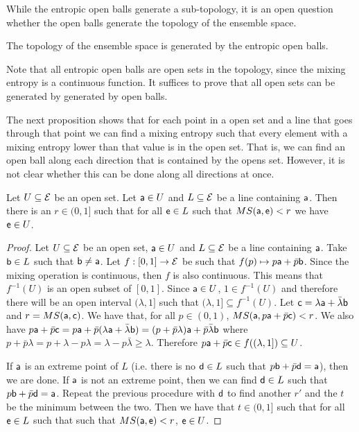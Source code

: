While the entropic open balls generate a sub-topology, it is an open question whether the open balls generate the topology of the ensemble space.

\begin{conj}
	The topology of the ensemble space is generated by the entropic open balls.
\end{conj}

\begin{remark}
	Note that all entropic open balls are open sets in the topology, since the mixing entropy is a continuous function. It suffices to prove that all open sets can be generated by generated by open balls.
	
	The next proposition shows that for each point in a open set and a line that goes through that point we can find a mixing entropy such that every element with a mixing entropy lower than that value is in the open set. That is, we can find an open ball along each direction that is contained by the opens set. However, it is not clear whether this can be done along all directions at once.
\end{remark}

\begin{prop}
	Let $U \subseteq \Ens$ be an open set. Let $\ens[a] \in U$ and $L \subseteq \Ens$ be a line containing $\ens[a]$. Then there is an $r \in (0,1]$ such that for all $\ens \in L$ such that $MS(\ens[a], \ens) < r$ we have $\ens \in U$.
\end{prop}

\begin{proof}
	Let $U \subseteq \Ens$ be an open set, $\ens[a] \in U$ and $L \subseteq \Ens$ be a line containing $\ens[a]$. Take $\ens[b] \in L$ such that $\ens[b] \neq \ens[a]$. Let $f : [0,1] \to \Ens$ be such that $f(p) \mapsto p \ens[a] + \bar{p} \ens[b]$. Since the mixing operation is continuous, then $f$ is also continuous. This means that $f^{-1}(U)$ is an open subset of $[0,1]$. Since $\ens[a] \in U$, $1 \in f^{-1}(U)$ and therefore there will be an open interval $(\lambda, 1]$ such that $(\lambda, 1] \subseteq f^{-1}(U)$. Let $\ens[c] = \lambda \ens[a] + \bar{\lambda} \ens[b]$ and $r = MS(\ens[a], \ens[c])$. We have that, for all $p \in (0,1)$, $MS(\ens[a], p\ens[a] +\bar{p}\ens[c])<r$. We also have $p\ens[a] +\bar{p}\ens[c] = p\ens[a] +\bar{p}(\lambda \ens[a] + \bar{\lambda} \ens[b]) = (p + \bar{p}\lambda)\ens[a] + \bar{p}\bar{\lambda}\ens[b]$ where $p + \bar{p}\lambda = p + \lambda - p\lambda = \lambda - p\bar{\lambda} \geq \lambda$. Therefore $p\ens[a] +\bar{p}\ens[c] \in f((\lambda,1]) \subseteq U$.
	
	If $\ens[a]$ is an extreme point of $L$ (i.e. there is no $\ens[d] \in L$ such that $p\ens[b] + \bar{p}\ens[d] = \ens[a]$), then we are done. If $\ens[a]$ is not an extreme point, then we can find $\ens[d] \in L$ such that $p\ens[b] + \bar{p}\ens[d] = \ens[a]$. Repeat the previous procedure with $\ens[d]$ to find another $r'$ and the $t$ be the minimum between the two. Then we have that $t \in (0,1]$ such that for all $\ens \in L$ such that such that $MS(\ens[a], \ens) < r$, $\ens \in U$.
\end{proof}

